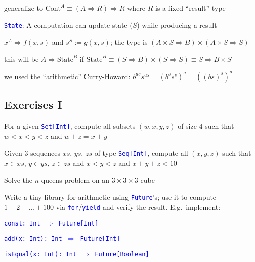 generalize to {\footnotesize{}$\text{Cont}^{A}\equiv\left(A\Rightarrow R\right)\Rightarrow R$
}where $R$ is a fixed ``result'' type

\texttt{\textcolor{blue}{\footnotesize{}State}}: A computation can
update state ($S$) while producing a result

$x^{A}\Rightarrow f(x,s)$ and $s^{S}:=g(x,s)$; the type is{\footnotesize{}
$\left(A\times S\Rightarrow B\right)\times\left(A\times S\Rightarrow S\right)$}{\footnotesize\par}

this will be $A\Rightarrow\text{State}^{B}$ if {\footnotesize{}$\text{State}^{B}\equiv\left(S\Rightarrow B\right)\times\left(S\Rightarrow S\right)\equiv S\Rightarrow B\times S$ }{\footnotesize\par}

we used the ``arithmetic'' Curry-Howard: $b^{as}s^{as}=(b^{s}s^{s})^{a}=\left(\left(bs\right)^{s}\right)^{a}$


\subsection{Exercises I}

For a given \texttt{\textcolor{blue}{\footnotesize{}Set{[}Int{]}}},
compute all subsets $\left(w,x,y,z\right)$ of size 4 such that $w<x<y<z$
and $w+z=x+y$

Given 3 sequences $xs$, $ys$, $zs$ of type \texttt{\textcolor{blue}{\footnotesize{}Seq{[}Int{]}}},
compute all $\left(x,y,z\right)$ such that $x\in xs$, $y\in ys$,
$z\in zs$ and $x<y<z$ and $x+y+z<10$

Solve the $n$-queens problem on an $3\times3\times3$ cube

Write a tiny library for arithmetic using \texttt{\textcolor{blue}{\footnotesize{}Future}}'s;
use it to compute $1+2+...+100$ via \texttt{\textcolor{blue}{\footnotesize{}for}}/\texttt{\textcolor{blue}{\footnotesize{}yield}}
and verify the result. E.g.\ implement: 

\texttt{\textcolor{blue}{\footnotesize{}const: Int $\Rightarrow$
Future{[}Int{]}}}{\footnotesize\par}

\texttt{\textcolor{blue}{\footnotesize{}add(x: Int): Int $\Rightarrow$
Future{[}Int{]}}}{\footnotesize\par}

\texttt{\textcolor{blue}{\footnotesize{}isEqual(x: Int): Int $\Rightarrow$
Future{[}Boolean{]} }}{\footnotesize\par}

